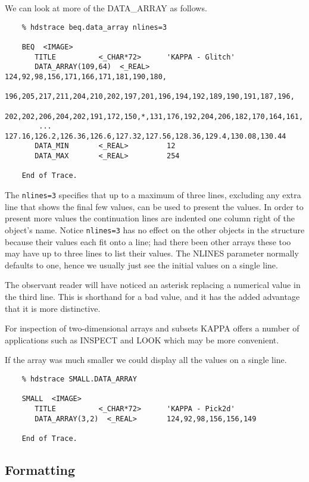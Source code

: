 We can look at more of the DATA\_ARRAY as follows.

\small
\begin{verbatim}
    % hdstrace beq.data_array nlines=3

    BEQ  <IMAGE>
       TITLE          <_CHAR*72>      'KAPPA - Glitch'
       DATA_ARRAY(109,64)  <_REAL>    124,92,98,156,171,166,171,181,190,180,
        196,205,217,211,204,210,202,197,201,196,194,192,189,190,191,187,196,
        202,202,206,204,202,191,172,150,*,131,176,192,204,206,182,170,164,161,
        ... 127.16,126.2,126.36,126.6,127.32,127.56,128.36,129.4,130.08,130.44
       DATA_MIN       <_REAL>         12
       DATA_MAX       <_REAL>         254

    End of Trace.
\end{verbatim}
\normalsize
The {\tt nlines=3} specifies that up to a maximum of three lines,
excluding any extra line that shows the final few values, can be
used to present the values.  In order to present more values the
continuation lines are indented one column right of the object's name.
Notice {\tt nlines=3} has no effect on the other objects in the
structure because their values each fit onto a line; had there been
other arrays these too may have up to three lines to list their
values.  The NLINES parameter normally defaults to one, hence we usually
just see the initial values on a single line.

The observant reader will have noticed an asterisk replacing a numerical
value in the third line.  This is shorthand for a bad value, and it
has the added advantage that it is more distinctive.

For inspection of two-dimensional arrays and subsets {\footnotesize KAPPA}
offers a number of applications such as INSPECT and LOOK which may be
more convenient.

If the array was much smaller we could display all the values on a single
line.

\small
\begin{verbatim}
    % hdstrace SMALL.DATA_ARRAY

    SMALL  <IMAGE>
       TITLE          <_CHAR*72>      'KAPPA - Pick2d'
       DATA_ARRAY(3,2)  <_REAL>       124,92,98,156,156,149

    End of Trace.
\end{verbatim}
\normalsize
\subsection{Formatting}

